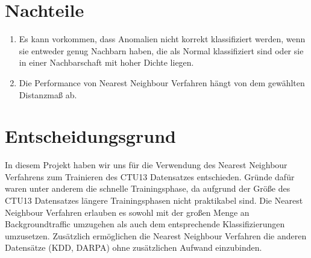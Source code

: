 \documentclass[a4paper,12pt]{article}
\begin{document}
\section{Nachteile}
\begin{center}
\begin{enumerate}
\item Es kann vorkommen, dass Anomalien nicht korrekt klassifiziert werden, wenn sie entweder genug Nachbarn haben, die als Normal klassifiziert sind oder sie in einer Nachbarschaft mit hoher Dichte liegen.
\item Die Performance von Nearest Neighbour Verfahren hängt von dem gewählten Distanzmaß ab.
\end{enumerate}
\end{center}
\section{Entscheidungsgrund}
In diesem Projekt haben wir uns für die Verwendung des Nearest Neighbour Verfahrens zum Trainieren des CTU13 Datensatzes entschieden. Gründe dafür waren unter anderem die schnelle Trainingsphase, da aufgrund der Größe des CTU13 Datensatzes längere Trainingsphasen nicht praktikabel sind. Die Nearest Neighbour Verfahren erlauben es sowohl mit der großen Menge an Backgroundtraffic umzugehen als auch dem entsprechende Klassifizierungen umzusetzen. Zusätzlich ermöglichen die Nearest Neighbour Verfahren die anderen Datensätze (KDD, DARPA) ohne zusätzlichen Aufwand einzubinden.
\end{document}
